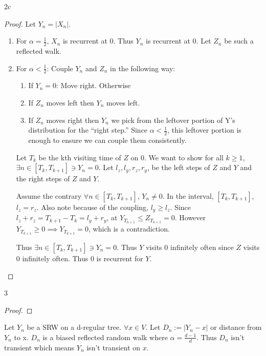 \documentclass{article}
\newcommand{\abs}[1]{\left\lvert #1\right\rvert}
\begin{document}
\begin{PROB}{2c}\label{Problem 2c.}
    
\end{PROB}
\begin{proof}
    Let $Y_n = \abs{X_n}$. 
    
    \begin{enumerate}
        \item For $\alpha = \frac{1}{2}$, $X_n$ is recurrent at 0. Thus $Y_n$ is recurrent at 0. Let $Z_n$ be such a reflected walk.    
        \item For $\alpha < \frac{1}{2}$: Couple $Y_n$ and $Z_n$ in the following way: 
    
        \begin{enumerate} 
            \item If $Y_n = 0$: Move right. Otherwise 
            \item If $Z_n$ moves left then $Y_n$ moves left. 
            \item If $Z_n$ moves right then $Y_n$  we pick from the leftover portion of 
            Y's distribution for the “right step.” Since
            $\alpha < \frac{1}{2}$, this leftover portion is enough to ensure we can couple them consistently.     
        \end{enumerate}

        Let $T_k$ be the kth visiting time of $Z$ on 0. We want to show for all $k \geq 1$, $\exists n \in [T_k, T_{k + 1}] \ni Y_n = 0$. Let $l_z, l_y, r_z, r_y$, be the left steps of $Z$ and $Y$  and the right steps of $Z$ and $Y$.
        
        Assume the contrary $\forall n \in [T_k, T_{k + 1}]$, $Y_n \neq 0$. 
        In the interval, $[T_k, T_{k + 1}]$, $l_z = r_z$. Also note because of the coupling, $l_y \geq l_z$. Since $l_z + r_z = T_{k + 1} - T_{k} = l_y + r_y$, at $Y_{T_{k + 1}} \leq Z_{T_{k + 1}} = 0$. However $Y_{T_{k + 1}} \geq 0 \implies Y_{T_{k + 1}} = 0$, which is a contradiction. 
        
        Thus $\exists n \in [T_k, T_{k + 1}] \ni Y_n = 0$. Thus $Y$ visits $0$ infinitely often since $Z$ visits $0$ infinitely often. Thus $0$ is recurrent for $Y$.       
    \end{enumerate}
    
\end{proof}

\bigskip


\begin{PROB}{3}\label{Problem 3.}
    
\end{PROB}
\begin{proof}
\end{proof}
    Let $Y_n$ be a SRW on a d-regular tree. 
    $\forall x \in V$. Let $D_n := \abs{Y_n - x}$ or distance from $Y_n$ to x. $D_n$ is a biased reflected random walk where $\alpha = \frac{d - 1}{d}$. Thus $D_n$ isn't transient which means $Y_n$  isn't transient on $x$. 
\bigskip
\end{document}
